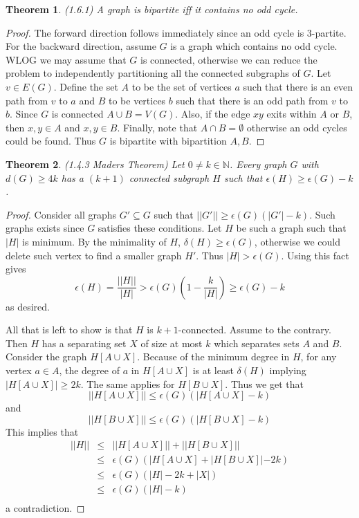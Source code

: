 \documentclass[12pt]{article}
\newtheorem{theorem}{Theorem}
\begin{document}
\begin{theorem} (1.6.1) A graph is bipartite iff it contains no odd cycle.
\end{theorem}
\begin{proof} The forward direction follows immediately since an odd
  cycle is $3$-partite.\\
  For the backward direction, assume $G$ is a graph which contains no
  odd cycle. WLOG we may assume that $G$ is connected, otherwise we
  can reduce the problem to independently partitioning all the
  connected subgraphs of $G$. Let $v \in E(G)$. Define the set $A$ to
  be the set of vertices $a$ such that there is an even path from $v$
  to $a$ and $B$ to be vertices $b$ such that there is an odd path
  from $v$ to $b$. Since $G$ is connected $A \cup B = V(G)$. Also, if
  the edge $xy$ exits within $A$ or $B$, then $x,y \in A$ and
  $x,y \in B$. Finally, note that $A \cap B = \emptyset$ otherwise an
  odd cycles could be found. Thus $G$ is bipartite with bipartition
  $A,B$.
\end{proof}

\begin{theorem} (1.4.3 Maders Theorem) Let $0 \neq k \in
  \mathbb{N}$. Every graph $G$ with $d(G) \geq 4k$ has a $(k + 1)$
  connected subgraph $H$ such that $\epsilon(H) \geq \epsilon(G) - k$.
\end{theorem}
\begin{proof} Consider all graphs $G' \subseteq G$ such that
  $||G'|| \geq \epsilon(G) (|G'| - k)$. Such graphs exists since $G$
  satisfies these conditions. Let $H$ be such a graph such that $|H|$
  is minimum. By the minimality of $H$, $\delta(H) \geq \epsilon(G)$,
  otherwise we could delete such vertex to find a smaller graph
  $H'$. Thus $|H| > \epsilon(G)$. Using this fact gives
  \[
    \epsilon(H) = \dfrac{||H||}{|H|} > \epsilon(G)(1 - \dfrac{k}{|H|})
    \geq \epsilon(G) - k
  \]
  as desired.

  All that is left to show is that $H$ is $k + 1$-connected. Assume to
  the contrary. Then $H$ has a separating set $X$ of size at most $k$
  which separates sets $A$ and $B$. Consider the graph $H[A \cup
  X]$. Because of the minimum degree in $H$, for any vertex $a \in A$,
  the degree of $a$ in $H[A \cup X]$ is at least $\delta(H)$ implying
  $|H[A \cup X]| \geq 2k$. The same applies for $H[B \cup X]$. Thus we
  get that
  \[
    ||H[A \cup X] || \leq \epsilon(G)(|H[A \cup X] - k)
  \]
  and
  \[
    ||H[B \cup X] || \leq \epsilon(G)(|H[B \cup X] - k)
  \]
  This implies that
  \[
    \begin{array}{rcl} ||H|| & \leq & ||H[A \cup X]|| + ||H[B \cup X]||\\
                             & \leq & \epsilon(G) (|H[A \cup X] + |H[B
                                      \cup X]| - 2k)\\
                             & \leq & \epsilon(G) (|H| - 2k + |X|)\\
                             & \leq & \epsilon(G) (|H| - k)\\
    \end{array}
  \]
  a contradiction.
\end{proof}
\end{document}
